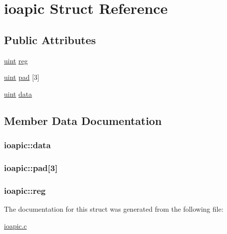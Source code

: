 \hypertarget{structioapic}{}\section{ioapic Struct Reference}
\label{structioapic}
\subsection*{Public Attributes}
\begin{DoxyCompactItemize}
\item 
\hyperlink{custom__types_8h_a91ad9478d81a7aaf2593e8d9c3d06a14}{uint} \hyperlink{structioapic_a84bff406f77801bd1574b9cfb8c23ecf}{reg}
\item 
\hyperlink{custom__types_8h_a91ad9478d81a7aaf2593e8d9c3d06a14}{uint} \hyperlink{structioapic_a28ee224d088b53995504eae8cc8fd6ba}{pad} \mbox{[}3\mbox{]}
\item 
\hyperlink{custom__types_8h_a91ad9478d81a7aaf2593e8d9c3d06a14}{uint} \hyperlink{structioapic_a0612c6bb75dc56f0c4c91ad214a02b3a}{data}
\end{DoxyCompactItemize}


\subsection{Member Data Documentation}
\subsubsection[{\texorpdfstring{data}{data}}]{ ioapic\+::data}\hypertarget{structioapic_a0612c6bb75dc56f0c4c91ad214a02b3a}{}\label{structioapic_a0612c6bb75dc56f0c4c91ad214a02b3a}
\subsubsection[{\texorpdfstring{pad}{pad}}]{ ioapic\+::pad\mbox{[}3\mbox{]}}\hypertarget{structioapic_a28ee224d088b53995504eae8cc8fd6ba}{}\label{structioapic_a28ee224d088b53995504eae8cc8fd6ba}
\subsubsection[{\texorpdfstring{reg}{reg}}]{ ioapic\+::reg}\hypertarget{structioapic_a84bff406f77801bd1574b9cfb8c23ecf}{}\label{structioapic_a84bff406f77801bd1574b9cfb8c23ecf}


The documentation for this struct was generated from the following file\+:\begin{DoxyCompactItemize}
\item 
\hyperlink{ioapic_8c}{ioapic.\+c}\end{DoxyCompactItemize}

